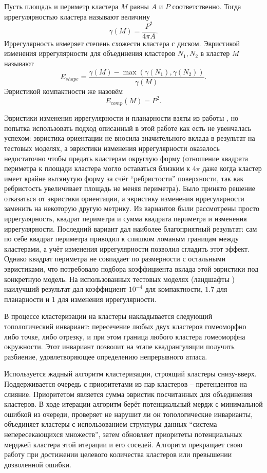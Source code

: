 Пусть площадь и периметр кластера $M$ равны $A$ и $P$ соответственно. Тогда иррегулярностью кластера называют величину
\[
  \gamma(M) = \frac{P^2}{4\pi A}.
\]
Иррегулярность измеряет степень схожести кластера с диском. Эвристикой изменения иррегулярности для объединения кластеров $N_1, N_2$ в кластер $M$ называют
\[
  E_{shape} = \frac{\gamma(M) - \max(\gamma(N_1), \gamma(N_2))}{\gamma(M)}.
\]
Эвристикой компактности же назовём
\[
  E_{comp}(M) = P^2.
\]

Эвристики изменения иррегулярности и планарности взяты из работы \cite{garland2001}, но попытка использовать подход описанный в этой работе как есть не увенчалась успехом: эвристика ориентации не вносила значительного вклада в результат на тестовых моделях, а эвристики изменения иррегулярности оказалось недостаточно чтобы предать кластерам округлую форму (отношение квадрата периметра к площади кластера могло оставаться близким к $4\pi$ даже когда кластер имеет крайне вытянутую форму за счёт ``ребристости'' поверхности, так как ребристость увеличивает площадь не меняя периметра). Было принято решение отказаться от эвристики ориентации, а эвристику изменения иррегулярности заменить на некоторую другую метрику. Из вариантов были рассмотрены просто иррегулярность, квадрат периметра и сумма квадрата периметра и изменения иррегулярности. Последний вариант дал наиболее благоприятный результат: сам по себе квадрат периметра приводил к слишком ломаным границам между кластерами, а учёт изменения иррегулярности позволил сгладить этот эффект. Однако квадрат периметра не совпадает по размерности с остальными эвристиками, что потребовало подбора коэффициента вклада этой эвристики под конкретную модель. На использованных тестовых моделях (ландшафты \cite{quixel_megascans}) наилучший результат дал коэффициент $10^{-4}$ для компактности, $1.7$ для планарности и $1$ для изменения иррегулярности.

В процессе кластеризации на кластеры накладывается следующий топологический инвариант: пересечение любых двух кластеров гомеоморфно либо точке, либо отрезку, и при этом граница любого кластера гомеоморфна окружности. Этот инвариант позволит на этапе квадрангуляции получить разбиение, удовлетворяющее определению непрерывного атласа.

Используется жадный алгоритм кластеризации, строящий кластеры снизу-вверх. Поддерживается очередь с приоритетами из пар кластеров -- претендентов на слияние. Приоритетом является сумма эвристик посчитанных для объединения кластеров. В ходе итерации алгоритм берёт потенциальный мердж с минимальной ошибкой из очереди, проверяет не нарушит ли он топологические инварианты, объединяет кластеры с использованием структуры данных ``система непересекающихся множеств'', затем обновляет приоритеты потенциальных мерджей кластера этой итерации и его соседей. Алгоритм прекращает свою работу при достижении целевого количества кластеров или превышении дозволенной ошибки.

